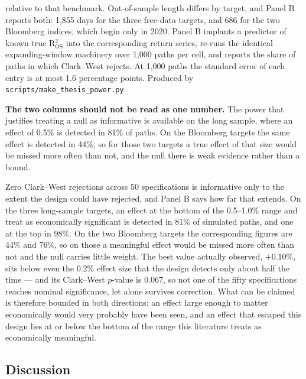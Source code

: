 \documentclass[12pt,a4paper]{article}
\begin{document}
\begin{table}[htbp]
\begin{threeparttable}
\begin{tablenotes}
relative to that benchmark. Out-of-sample length differs by target, and Panel B
reports both: 1,855 days for the three free-data targets, and 686 for the two
Bloomberg indices, which begin only in 2020. Panel B implants a predictor of
known true R$^2_{\text{OS}}$ into the corresponding return series, re-runs the
identical expanding-window machinery over 1,000 paths per cell, and reports the
share of paths in which Clark--West rejects. At 1,000 paths the standard error
of each entry is at most 1.6 percentage points. Produced by
\texttt{scripts/make\_thesis\_power.py}.
\item \textbf{The two columns should not be read as one number.} The power that
justifies treating a null as informative is available on the long sample, where
an effect of 0.5\% is detected in 81\% of paths. On the Bloomberg targets the
same effect is detected in 44\%, so for those two targets a true effect of that
size would be missed more often than not, and the null there is weak evidence
rather than a bound.
\end{tablenotes}
\end{threeparttable}
\end{table}

Zero Clark--West rejections across 50 specifications is informative only to the extent the design could have rejected, and Panel B says how far that extends. On the three long-sample targets, an effect at the bottom of the 0.5--1.0\% range \citet{welch2008} and \citet{campbell2008} treat as economically significant is detected in 81\% of simulated paths, and one at the top in 98\%. On the two Bloomberg targets the corresponding figures are 44\% and 76\%, so on those a meaningful effect would be missed more often than not and the null carries little weight. The best value actually observed, $+0.10\%$, sits below even the 0.2\% effect size that the design detects only about half the time --- and its Clark--West $p$-value is 0.067, so not one of the fifty specifications reaches nominal significance, let alone survives correction. What can be claimed is therefore bounded in both directions: an effect large enough to matter economically would very probably have been seen, and an effect that escaped this design lies at or below the bottom of the range this literature treats as economically meaningful.

\subsection{Discussion}
\label{sec:robustness}
\end{document}

